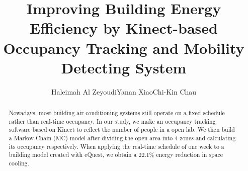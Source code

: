 \documentclass{sig-alternate}
\begin{document}
\title{Improving Building Energy Efficiency by Kinect-based Occupancy
  Tracking and Mobility Detecting System}

\author{
\alignauthor
Haleimah Al Zeyoudi\quad Yanan Xiao\quad Chi-Kin Chau\\
}



\maketitle{}



\begin{abstract}
  Nowadays, most building air conditioning systems still operate on a
  fixed schedule rather than real-time occupancy. In our study, we
  make an occupancy tracking software based on Kinect to reflect the
  number of people in a open lab. We then build a Markov Chain (MC)
  model after dividing the open area into 4 zones and calculating its
  occupancy respectively. When applying the real-time schedule of one
  week to a building model created with eQuest, we obtain a 22.1\%
  energy reduction in space cooling.
\end{abstract}









\end{document}
